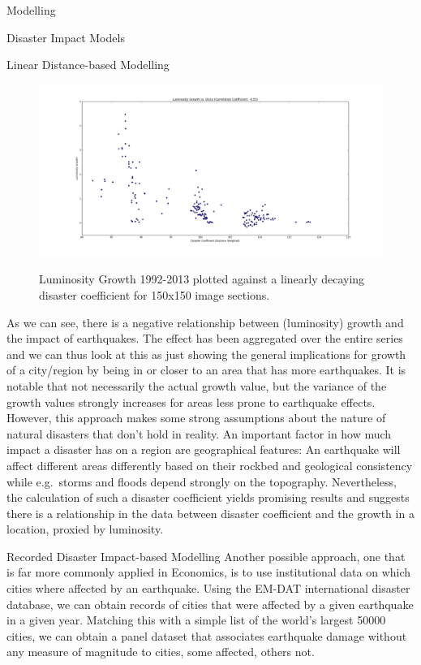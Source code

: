 \documentclass[12pt,fleqn,leqno,letterpaper]{article}
\begin{document}
\begin{section}{Modelling}
\begin{subsection}{Disaster Impact Models}
\begin{subsubsection}{Linear Distance-based Modelling}
      \begin{figure}
        \centering
        \includegraphics[width=1\linewidth]{linear-lum-vs-disco}\label{fig:linear-model-disco-vs-lum-growth} %
        \caption{Luminosity Growth 1992-2013 plotted against a linearly decaying disaster coefficient for 150x150 image sections.}
      \end{figure}
      As we can see, there is a negative relationship between (luminosity) growth and the impact of earthquakes. The effect has been aggregated over the entire series and we can thus look at this as just showing the general implications for growth of a city/region by being in or closer to an area that has more earthquakes. It is notable that not necessarily the actual growth value, but the variance of the growth values strongly increases for areas less prone to earthquake effects.\\
      However, this approach makes some strong assumptions about the nature of natural disasters that don't hold in reality. An important factor in how much impact a disaster has on a region are geographical features: An earthquake will affect different areas differently based on their rockbed and geological consistency while e.g.\ storms and floods depend strongly on the topography. Nevertheless, the calculation of such a disaster coefficient yields promising results and suggests there is a relationship in the data between disaster coefficient and the growth in a location, proxied by luminosity.
    \end{subsubsection}
    \begin{subsubsection}{Recorded Disaster Impact-based Modelling}
      Another possible approach, one that is far more commonly applied in Economics, is to use institutional data on which cities where affected by an earthquake. Using the EM-DAT international disaster database, we can obtain records of cities that were affected by a given earthquake in a given year. Matching this with a simple list of the world's largest 50000 cities, we can obtain a panel dataset that associates earthquake damage without any measure of magnitude to cities, some affected, others not.

\end{subsubsection}
\end{subsection}
\end{section}
\end{document}
